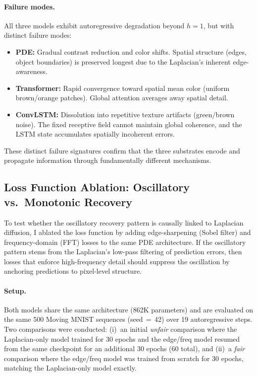 \documentclass{article}
\begin{document}
\paragraph{Failure modes.}
All three models exhibit autoregressive degradation beyond $h\!=\!1$, but with distinct failure modes:
\begin{itemize}
    \item \textbf{PDE:} Gradual contrast reduction and color shifts. Spatial structure (edges, object boundaries) is preserved longest due to the Laplacian's inherent edge-awareness.
    \item \textbf{Transformer:} Rapid convergence toward spatial mean color (uniform brown/orange patches). Global attention averages away spatial detail.
    \item \textbf{ConvLSTM:} Dissolution into repetitive texture artifacts (green/brown noise). The fixed receptive field cannot maintain global coherence, and the LSTM state accumulates spatially incoherent errors.
\end{itemize}
These distinct failure signatures confirm that the three substrates encode and propagate information through fundamentally different mechanisms.

\subsection{Loss Function Ablation: Oscillatory vs.\ Monotonic Recovery}
\label{sec:ablation}

To test whether the oscillatory recovery pattern is causally linked to Laplacian diffusion, I ablated the loss function by adding edge-sharpening (Sobel filter) and frequency-domain (FFT) losses to the same PDE architecture. If the oscillatory pattern stems from the Laplacian's low-pass filtering of prediction errors, then losses that enforce high-frequency detail should suppress the oscillation by anchoring predictions to pixel-level structure.

\paragraph{Setup.} Both models share the same architecture (862K parameters) and are evaluated on the same 500 Moving MNIST sequences (seed\,$=$\,42) over 19 autoregressive steps. Two comparisons were conducted: (i)~an initial \emph{unfair} comparison where the Laplacian-only model trained for 30 epochs and the edge/freq model resumed from the same checkpoint for an additional 30 epochs (60 total), and (ii)~a \emph{fair} comparison where the edge/freq model was trained from scratch for 30 epochs, matching the Laplacian-only model exactly.
\end{document}
